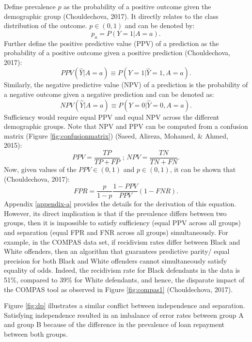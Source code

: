 \documentclass[12pt, twoside]{amherstthesis}
\begin{document}
Define prevalence \(p\) as the probability of a positive outcome given the demographic group (Chouldechova, 2017). It directly relates to the class distribution of the outcome. \(p \in (0,1)\) and can be denoted by:
\begin{equation}
\label{ch1eq14}
p_a = P(Y=1|A=a).
\end{equation}
Further define the positive predictive value (PPV) of a prediction as the probability of a positive outcome given a positive prediction (Chouldechova, 2017):
\begin{equation}
\label{ch1eq15}
PPV(\hat{Y}|A = a) \equiv P (Y = 1| \hat{Y} = 1, A = a).
\end{equation}
Similarly, the negative predictive value (NPV) of a prediction is the probability of a negative outcome given a negative prediction and can be denoted as:
\begin{equation}
\label{ch1eq16}
NPV(\hat{Y}|A = a) \equiv P (Y = 0| \hat{Y} = 0, A = a).
\end{equation}
Sufficiency would require equal PPV and equal NPV across the different demographic groups. Note that NPV and PPV can be computed from a confusion matrix (Figure \ref{fig:confusionmatrix}) (Saeed, Alireza, Mohamed, \& Ahmed, 2015):
\begin{equation}
\label{ch1eq17}
PPV = \frac{TP}{TP + FP} \text{   ;   } NPV = \frac{TN}{TN + FN}.
\end{equation}
Now, given values of the \(PPV \in (0,1)\) and \(p \in (0,1)\), it can be shown that (Chouldechova, 2017):
\begin{equation}
\label{ch1eq18}
FPR = \frac{p}{1-p} \frac{1-PPV}{PPV}(1 - FNR).
\end{equation}
Appendix \ref{appendix-a} provides the details for the derivation of this equation. However, its direct implication is that if the prevalence differs between two groups, then it is impossible to satisfy sufficiency (equal PPV across all groups) and separation (equal FPR and FNR across all groups) simultaneously. For example, in the COMPAS data set, if recidivism rates differ between Black and White offenders, then an algorithm that guarantees predictive parity/ equal precision for both Black and White offenders cannot simultaneously satisfy equality of odds. Indeed, the recidivism rate for Black defendants in the data is 51\%, compared to 39\% for White defendants, and hence, the disparate impact of the COMPAS tool as observed in Figure \ref{fig:compas1} (Chouldechova, 2017).

Figure \ref{fig:dp} illustrates a similar conflict between independence and separation. Satisfying independence resulted in an imbalance of error rates between group A and group B because of the difference in the prevalence of loan repayment between both groups.
\end{document}
